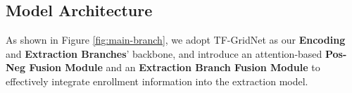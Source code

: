 




\subsection{Model Architecture}


As shown in Figure \ref{fig:main-branch}, we adopt TF-GridNet \cite{tfgridnet} as our \textbf{Encoding} and \textbf{Extraction Branches}' backbone, and introduce an attention-based \textbf{Pos-Neg Fusion Module} and an \textbf{Extraction Branch Fusion Module} to effectively integrate enrollment information into the extraction model.

